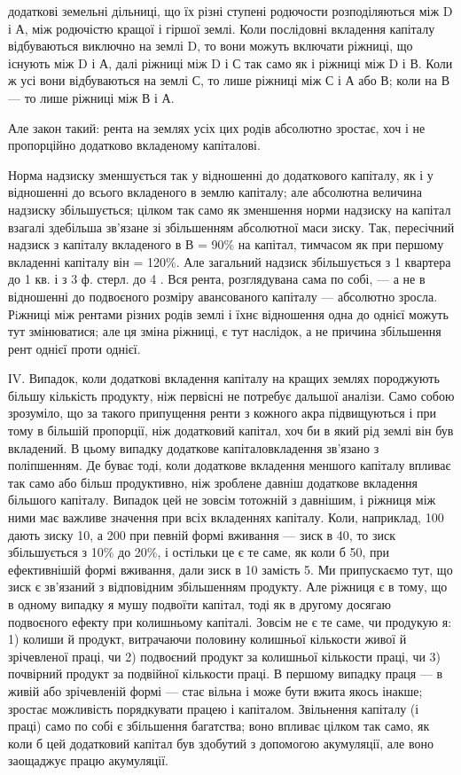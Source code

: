 \parcont{}  %
додаткові земельні дільниці, що їх різні ступені родючости розподіляються між
D і А, між родючістю кращої і гіршої землі. Коли послідовні вкладення капіталу
відбуваються виключно на землі D, то вони можуть включати ріжниці, що
існують між D і А, далі ріжниці між D і С так само як і ріжниці між D і В.
Коли ж усі вони відбуваються на землі С, то лише ріжниці між С і А або В;
коли на В — то лише ріжниці між В і А.

Але закон такий: рента на землях усіх цих родів абсолютно зростає, хоч
і не пропорційно додатково вкладеному капіталові.

Норма надзиску зменшується так у відношенні до додаткового капіталу,
як і у відношенні до всього вкладеного в землю капіталу; але абсолютна величина
надзиску збільшується; цілком так само як зменшення норми надзиску
на капітал взагалі здебільша зв’язане зі збільшенням абсолютної маси зиску.
Так, пересічний надзиск з капіталу вкладеного в В = 90\% на капітал, тимчасом
як при першому вкладенні капіталу він = 120\%. Але загальний надзиск
збільшується з 1 квартера до 1  кв. і з 3 ф. стерл. до 4  . Вся рента,
розглядувана сама по собі, — а не в відношенні до подвоєного розміру авансованого
капіталу — абсолютно зросла. Рiжниці між рентами різних родів землі і
їхнє відношення одна до однієї можуть тут змінюватися; але ця зміна ріжниці,
є тут наслідок, а не причина збільшення рент однієї проти однієї.

ІV. Випадок, коли додаткові вкладення капіталу на кращих землях породжують
більшу кількість продукту, ніж первісні не потребує дальшої аналізи.
Само собою зрозуміло, що за такого припущення ренти з кожного
акра підвищуються і при тому в більшій пропорції, ніж додатковий капітал,
хоч би в який рід землі він був вкладений. В цьому випадку додаткове
капіталовкладення зв’язано з поліпшенням. Де буває тоді, коли додаткове
вкладення меншого капіталу впливає так само або більш продуктивно, ніж зроблене
давніш додаткове вкладення більшого капіталу. Випадок цей не зовсім тотожній
з давнішим, і ріжниця між ними має важливе значення при всіх
вкладеннях капіталу. Коли, наприклад, 100 дають зиску 10, а 200 при певній
формі вживання — зиск в 40, то зиск збільшується з 10\% до 20\%, і остільки
це є те саме, як коли б 50, при ефективнішій формі вживання, дали зиск в 10
замість 5. Ми припускаємо тут, що зиск є зв’язаний з відповідним збільшенням
продукту. Але ріжниця є в тому, що в одному випадку я мушу подвоїти капітал,
тоді як в другому досягаю подвоєного ефекту при колишньому капіталі.
Зовсім не є те саме, чи продукую я: 1) колиши й продукт, витрачаючи половину
колишньої кількости живої й зрічевленої праці, чи 2) подвоєний продукт
за колишньої кількости праці, чи 3) почвірний продукт за подвійної кількости
праці. В першому випадку праця — в живій або зрічевленій формі — стає вільна
і може бути вжита якось інакше; зростає можливість порядкувати працею
і капіталом. Звільнення капіталу (і праці) само по собі є збільшення багатства;
воно впливає цілком так само, як коли б цей додатковий капітал був здобутий
з допомогою акумуляції, але воно заощаджує працю акумуляції.

